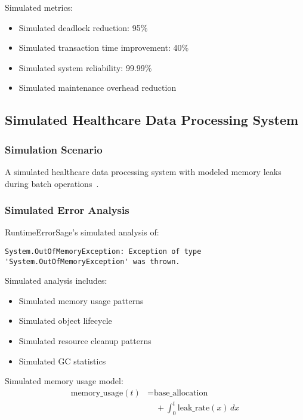 Simulated metrics:
\begin{itemize}
    \item Simulated deadlock reduction: 95\%
    \item Simulated transaction time improvement: 40\%
    \item Simulated system reliability: 99.99\%
    \item Simulated maintenance overhead reduction
\end{itemize}

\subsection{Simulated Healthcare Data Processing System}

\subsubsection{Simulation Scenario}
A simulated healthcare data processing system with modeled memory leaks during batch operations~\cite{memory_management_2023}.

\subsubsection{Simulated Error Analysis}
RuntimeErrorSage's simulated analysis of:
\begin{lstlisting}[style=csharpstyle,caption={Simulated Memory Leak Error}]
System.OutOfMemoryException: Exception of type 'System.OutOfMemoryException' was thrown.
\end{lstlisting}

Simulated analysis includes:
\begin{itemize}
    \item Simulated memory usage patterns
    \item Simulated object lifecycle
    \item Simulated resource cleanup patterns
    \item Simulated GC statistics
\end{itemize}

Simulated memory usage model:
\begin{equation}
\begin{split}
\text{memory\_usage}(t) &= \text{base\_allocation} \\
&\quad + \int_{0}^{t} \text{leak\_rate}(x) \,dx
\end{split}
\end{equation}

